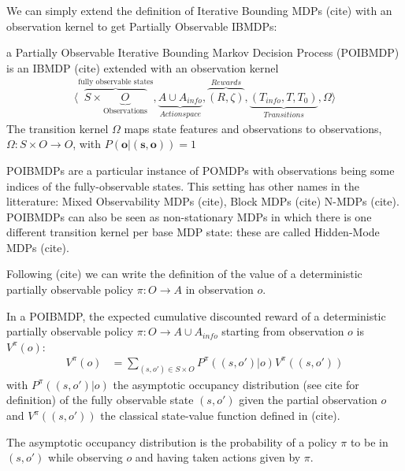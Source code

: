We can simply extend the definition of Iterative Bounding MDPs (cite) with an observation kernel to get Partially Observable IBMDPs:
\begin{definition} a Partially Observable Iterative Bounding Markov Decision Process (POIBMDP) is an IBMDP (cite) extended with an observation kernel 
    \begin{align*}
        \langle \overbrace{S\times \underbrace{O}_{\text{Observations}}}^{\text{fully observable states}}, \underbrace{A\cup A_{info}}_{Action space}, \overbrace{(R, \zeta)}^{Rewards}, \underbrace{(T_{info}, T, T_0)}_{Transitions}, \Omega \rangle
    \end{align*}
    The transition kernel $\Omega$ maps state features and observations to observations, $\Omega:S\times O \rightarrow O$, with $P(\boldsymbol{o}|(\boldsymbol{s}, \boldsymbol{o}))=1$ 
\end{definition}

POIBMDPs are a particular instance of POMDPs with observations being some indices of the fully-observable states. This setting has other names in the litterature: Mixed Observability MDPs (cite), Block MDPs (cite) N-MDPs (cite).
POIBMDPs can also be seen as non-stationary MDPs in which there is one different transition kernel per base MDP state: these are called Hidden-Mode MDPs (cite). 

Following (cite) we can write the definition of the value of a deterministic partially observable policy $\pi:O\rightarrow A$ in observation $o$.

\begin{definition} In a POIBMDP, the expected cumulative discounted reward of a deterministic partially observable policy $\pi:O\rightarrow A\cup A_{info}$ starting from observation $o$ is $V^{\pi}(o)$:
    \begin{align*}
        V^{\pi}(o) &= \underset{(s,o')\in S\times O}{\sum}P^{\pi}((s, o')|o)V^{\pi}((s, o'))
    \end{align*}
with $P^{\pi}((s, o')|o)$ the asymptotic occupancy distribution (see cite for definition) of the fully observable state $(s,o')$ given the partial observation $o$ and $V^{\pi}((s, o'))$ the classical state-value function defined in (cite).
\end{definition}


The asymptotic occupancy distribution is the probability of a policy $\pi$ to be in $(s,o')$ while observing $o$ and having taken actions given by $\pi$.  

